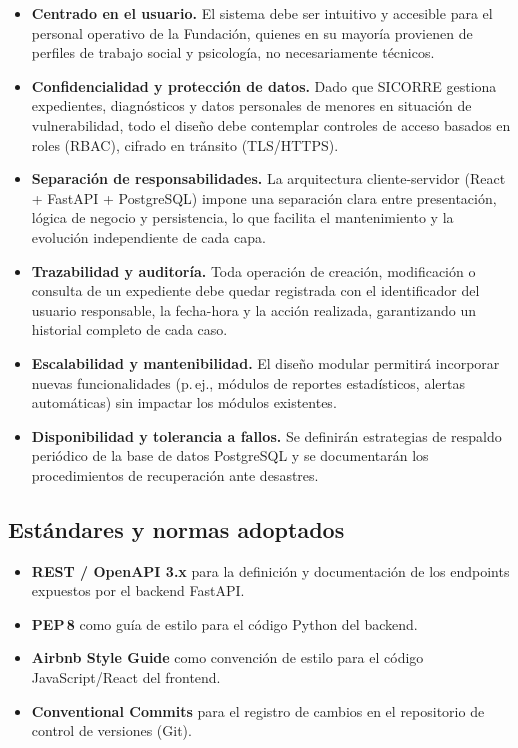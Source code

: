 \begin{itemize}
	\item \textbf{Centrado en el usuario.} El sistema debe ser intuitivo y accesible para
	el personal operativo de la Fundación, quienes en su mayoría provienen de perfiles
	de trabajo social y psicología, no necesariamente técnicos.
	
	\item \textbf{Confidencialidad y protección de datos.} Dado que SICORRE gestiona
	expedientes, diagnósticos y datos personales de menores en situación de
	vulnerabilidad, todo el diseño debe contemplar controles de acceso basados en
	roles (RBAC), cifrado en tránsito (TLS/HTTPS).
	\item \textbf{Separación de responsabilidades.} La arquitectura cliente-servidor
	(React + FastAPI + PostgreSQL) impone una separación clara entre presentación,
	lógica de negocio y persistencia, lo que facilita el mantenimiento y la
	evolución independiente de cada capa.
	
	\item \textbf{Trazabilidad y auditoría.} Toda operación de creación, modificación o
	consulta de un expediente debe quedar registrada con el identificador del usuario
	responsable, la fecha-hora y la acción realizada, garantizando un historial
	completo de cada caso.
	
	\item \textbf{Escalabilidad y mantenibilidad.} El diseño modular permitirá incorporar
	nuevas funcionalidades (p.\,ej., módulos de reportes estadísticos, alertas
	automáticas) sin impactar los módulos existentes.
	
	\item \textbf{Disponibilidad y tolerancia a fallos.} Se definirán estrategias de
	respaldo periódico de la base de datos PostgreSQL y se documentarán los
	procedimientos de recuperación ante desastres.
\end{itemize}

\subsection*{Estándares y normas adoptados}

\begin{itemize}
	\item \textbf{REST / OpenAPI 3.x} para la definición y documentación de los
	endpoints expuestos por el backend FastAPI.
	\item \textbf{PEP\,8} como guía de estilo para el código Python del backend.
	\item \textbf{Airbnb Style Guide} como convención de estilo para el código
	JavaScript/React del frontend.
	\item \textbf{Conventional Commits} para el registro de cambios en el repositorio
	de control de versiones (Git).

\end{itemize}

